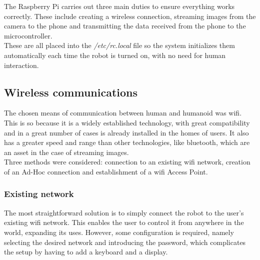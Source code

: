 The Raspberry Pi carries out three main duties to ensure everything works correctly. These include creating a wireless connection, streaming images from the camera to the phone and transmitting the data received from the phone to the microcontroller.\\

 These are all placed into the \textit{/etc/rc.local} file so the system initializes them automatically each time the robot is turned on, with no need for human interaction.








\subsection{Wireless communications}%

The chosen means of communication between human and humanoid was wifi. This is so because it is a widely established technology, with great compatibility and in a great number of cases is already installed in the homes of users. It also has a greater speed and range than other technologies, like bluetooth, which are an asset in the case of streaming images.\\

Three methods were considered: connection to an existing wifi network, creation of an Ad-Hoc connection and establishment of a wifi Access Point.










\subsubsection{Existing network}

The most straightforward solution is to simply connect the robot to the user's existing wifi network. This enables the user to control it from anywhere in the world, expanding its uses. However, some configuration is required, namely selecting the desired network and introducing the password, which complicates the setup by having to add a keyboard and a display.\\

